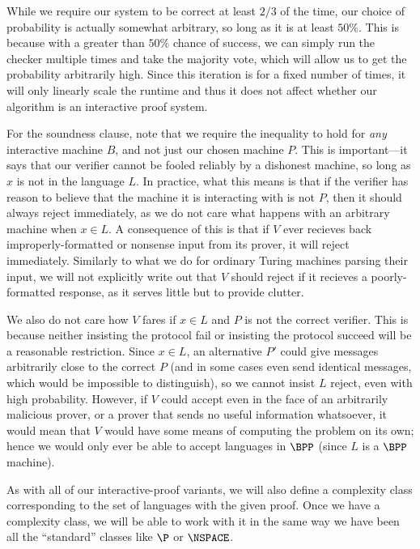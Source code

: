 \documentclass[english,12pt]{reedthesis}
\theoremstyle{plain}
\theoremstyle{definition}
\theoremstyle{remark}
\begin{document}
While we require our system to be correct at least $2/3$ of the time, our choice
of probability is actually somewhat arbitrary, so long as it is at least $50\%$.
This is because with a greater than $50\%$ chance of success, we can simply run
the checker multiple times and take the majority vote, which will allow us to
get the probability arbitrarily high. Since this iteration is for a fixed number
of times, it will only linearly scale the runtime and thus it does not affect
whether our algorithm is an interactive proof system.

For the soundness clause, note that we require the inequality to hold for
\emph{any} interactive machine $B$, and not just our chosen machine $P$. This is
important---it says that our verifier cannot be fooled reliably by a dishonest
machine, so long as $x$ is not in the language $L$. In practice, what this means
is that if the verifier has reason to believe that the machine it is interacting
with is not $P$, then it should always reject immediately, as we do not care
what happens with an arbitrary machine when $x \in L$. A consequence of this is
that if $V$ ever recieves back improperly-formatted or nonsense input from its
prover, it will reject immediately. Similarly to what we do for ordinary Turing
machines parsing their input, we will not explicitly write out that $V$ should
reject if it recieves a poorly-formatted response, as it serves little but to
provide clutter.

We also do not care how $V$ fares if $x \in L$ and $P$ is not the correct
verifier. This is because neither insisting the protocol fail or insisting the
protocol succeed will be a reasonable restriction. Since $x \in L$, an alternative
$P'$ could give messages arbitrarily close to the correct $P$ (and in some cases
even send identical messages, which would be impossible to distinguish), so we
cannot insist $L$ reject, even with high probability. However, if $V$ could
accept even in the face of an arbitrarily malicious prover, or a prover that
sends no useful information whatsoever, it would mean that $V$ would have some
means of computing the problem on its own; hence we would only ever be able to
accept languages in $\BPP$ (since $L$ is a $\BPP$ machine).

As with all of our interactive-proof variants, we will also define a complexity
class corresponding to the set of languages with the given proof. Once we have a
complexity class, we will be able to work with it in the same way we have been
all the ``standard'' classes like $\P$ or $\NSPACE$.
\end{document}

